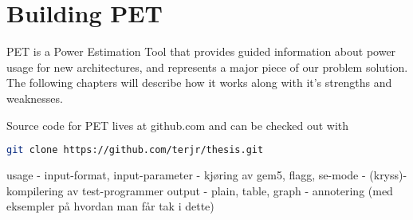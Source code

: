 \chapter{Building PET}
PET is a Power Estimation Tool that provides guided information about power
usage for new architectures, and represents a major piece of our problem
solution. The following chapters will describe how it works along with it's
strengths and weaknesses.

\noindent Source code for PET lives at github.com and can be checked out with
\begin{lstlisting}[language=bash]
git clone https://github.com/terjr/thesis.git
\end{lstlisting}







usage
- input-format, input-parameter
- kjøring av gem5, flagg, se-mode
- (kryss)-kompilering av test-programmer
output
- plain, table, graph
- annotering (med eksempler på hvordan man får tak i dette)
